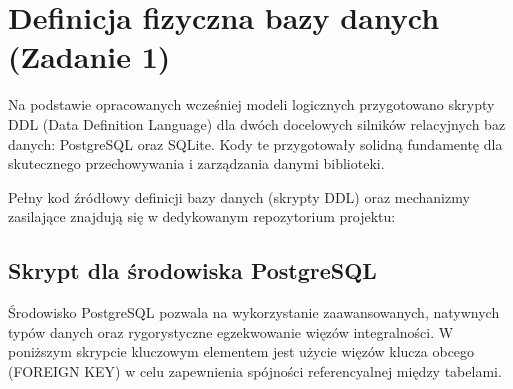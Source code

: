 \documentclass[a4paper,11pt,english,openany,oneside]{sphinxmanual}
\begin{document}
\section{Definicja fizyczna bazy danych (Zadanie 1)}
\label{\detokenize{rozdzial_4/index:definicja-fizyczna-bazy-danych-zadanie-1}}
\sphinxAtStartPar
Na podstawie opracowanych wcześniej modeli logicznych przygotowano skrypty DDL (Data Definition Language) dla dwóch docelowych silników relacyjnych baz danych: PostgreSQL oraz SQLite. Kody te przygotowały solidną fundamentę dla skutecznego przechowywania i zarządzania danymi biblioteki.

\sphinxAtStartPar
Pełny kod źródłowy definicji bazy danych (skrypty DDL) oraz mechanizmy zasilające znajdują się w dedykowanym repozytorium projektu:
%
\begin{footnote}[8]\sphinxAtStartFootnote
{}
%
\end{footnote}


\subsection{Skrypt dla środowiska PostgreSQL}
\label{\detokenize{rozdzial_4/index:skrypt-dla-srodowiska-postgresql}}
\sphinxAtStartPar
Środowisko PostgreSQL pozwala na wykorzystanie zaawansowanych, natywnych typów danych oraz rygorystyczne egzekwowanie więzów integralności. W poniższym skrypcie kluczowym elementem jest użycie więzów klucza obcego (FOREIGN KEY) w celu zapewnienia spójności referencyalnej między tabelami.
\end{document}
